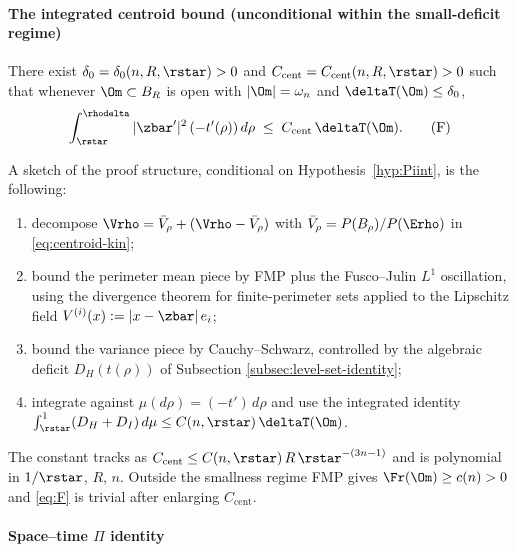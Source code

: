 \paragraph{The integrated centroid bound (unconditional within
the small-deficit regime)}

\begin{theorem}\label{thm:centroid-H1}
There exist $\delta_{0}=\delta_{0}(n,R,\rstar)>0$ and
$C_{\mathrm{cent}}=C_{\mathrm{cent}}(n,R,\rstar)>0$ such that
whenever $\Om\subset B_{R}$ is open with $|\Om|=\omega_{n}$ and
$\deltaT(\Om)\le\delta_{0}$,
\begin{equation}\label{eq:F}
   \int_{\rstar}^{\rhodelta}|\zbar^{\prime}|^{2}\,(-t'(\rho))\,d\rho
   \;\le\;
   C_{\mathrm{cent}}\,\deltaT(\Om). \tag{F}
\end{equation}
\end{theorem}

\noindent
A sketch of the proof structure, conditional on
Hypothesis~\ref{hyp:Piint}, is the following:
\begin{enumerate}
\item[(i)] decompose
$\Vrho=\bar V_{\rho}+(\Vrho-\bar V_{\rho})$ with
$\bar V_{\rho}=P(B_{\rho})/P(\Erho)$ in \eqref{eq:centroid-kin};
\item[(ii)] bound the perimeter mean piece by FMP plus the
Fusco--Julin $L^{1}$ oscillation, using the divergence theorem for
finite-perimeter sets applied to the Lipschitz field
$V^{(i)}(x):=|x-\zbar|\,e_{i}$;
\item[(iii)] bound the variance piece by Cauchy--Schwarz, controlled
by the algebraic deficit $D_{H}(t(\rho))$ of
Subsection \ref{subsec:level-set-identity};
\item[(iv)] integrate against $\mu(d\rho)=(-t')\,d\rho$ and use the
integrated identity $\int_{\rstar}^{1}(D_{H}+D_{I})\,d\mu\le
C(n,\rstar)\,\deltaT(\Om)$.
\end{enumerate}
The constant tracks as
$C_{\mathrm{cent}}\le C(n,\rstar)\,R\,\rstar^{-(3n-1)}$ and is
polynomial in $1/\rstar$, $R$, $n$. Outside the smallness regime FMP
gives $\Fr(\Om)\ge c(n)>0$ and \eqref{eq:F} is trivial after
enlarging $C_{\mathrm{cent}}$.

\paragraph{Space--time \texorpdfstring{$\Pi$}{Pi} identity}

